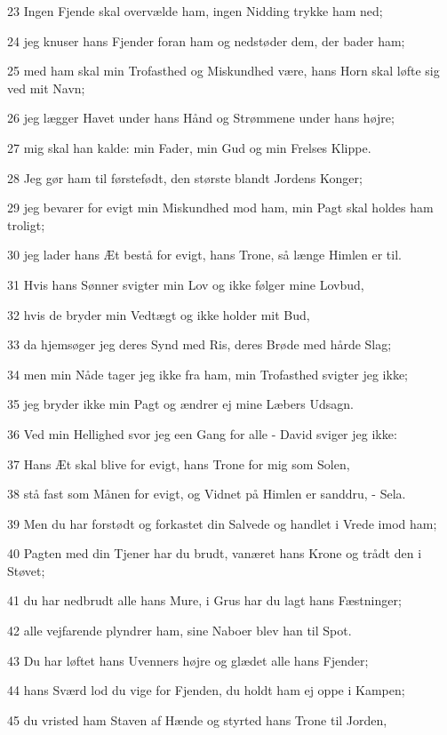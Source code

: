 \par 23 Ingen Fjende skal overvælde ham, ingen Nidding trykke ham ned;
\par 24 jeg knuser hans Fjender foran ham og nedstøder dem, der bader ham;
\par 25 med ham skal min Trofasthed og Miskundhed være, hans Horn skal løfte sig ved mit Navn;
\par 26 jeg lægger Havet under hans Hånd og Strømmene under hans højre;
\par 27 mig skal han kalde: min Fader, min Gud og min Frelses Klippe.
\par 28 Jeg gør ham til førstefødt, den største blandt Jordens Konger;
\par 29 jeg bevarer for evigt min Miskundhed mod ham, min Pagt skal holdes ham troligt;
\par 30 jeg lader hans Æt bestå for evigt, hans Trone, så længe Himlen er til.
\par 31 Hvis hans Sønner svigter min Lov og ikke følger mine Lovbud,
\par 32 hvis de bryder min Vedtægt og ikke holder mit Bud,
\par 33 da hjemsøger jeg deres Synd med Ris, deres Brøde med hårde Slag;
\par 34 men min Nåde tager jeg ikke fra ham, min Trofasthed svigter jeg ikke;
\par 35 jeg bryder ikke min Pagt og ændrer ej mine Læbers Udsagn.
\par 36 Ved min Hellighed svor jeg een Gang for alle - David sviger jeg ikke:
\par 37 Hans Æt skal blive for evigt, hans Trone for mig som Solen,
\par 38 stå fast som Månen for evigt, og Vidnet på Himlen er sanddru, - Sela.
\par 39 Men du har forstødt og forkastet din Salvede og handlet i Vrede imod ham;
\par 40 Pagten med din Tjener har du brudt, vanæret hans Krone og trådt den i Støvet;
\par 41 du har nedbrudt alle hans Mure, i Grus har du lagt hans Fæstninger;
\par 42 alle vejfarende plyndrer ham, sine Naboer blev han til Spot.
\par 43 Du har løftet hans Uvenners højre og glædet alle hans Fjender;
\par 44 hans Sværd lod du vige for Fjenden, du holdt ham ej oppe i Kampen;
\par 45 du vristed ham Staven af Hænde og styrted hans Trone til Jorden,
